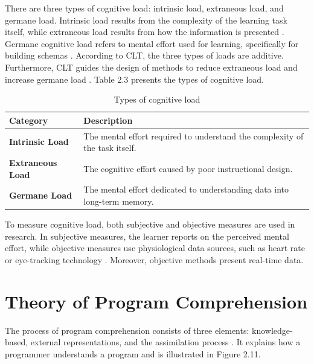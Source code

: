 There are three types of cognitive load: intrinsic load, extraneous load, and germane load. Intrinsic load results from the complexity of the learning task itself, while extraneous load results from how the information is presented \cite{schnotz2007reconsideration}. Germane cognitive load refers to mental effort used for learning, specifically for building schemas \cite{chen2009cognitive}. According to CLT, the three types of loads are additive. Furthermore, CLT guides the design of methods to reduce extraneous load and increase germane load  \cite{chen2009cognitive}. Table 2.3 presents the types of cognitive load.



\begin{table}[ht]
\centering
\small 
\caption{Types of cognitive load}
\begin{tabular}{p{} | p{}}
\hline
\rule{0pt}{1.2em}\textbf{Category} & \textbf{Description} \\[0.5em]
\hline
\rule{0pt}{1.2em}\textbf{Intrinsic Load} & The mental effort required to understand the complexity of the task itself. \\[0.5em]
\hline
\rule{0pt}{1.2em}\textbf{Extraneous Load} & The cognitive effort caused by poor instructional design. \\[0.5em]
\hline
\rule{0pt}{1.2em}\textbf{Germane Load} & The mental effort dedicated to understanding data into long-term memory. \\[0.5em]
\hline
\end{tabular}
\label{tab:cognitive_load}
\end{table}



To measure cognitive load, both subjective and objective measures are used in research.
In subjective measures, the  learner reports on the perceived mental effort, while objective measures use physiological data sources, such as heart rate or eye-tracking technology \cite{duran2022cognitive}. Moreover, objective methods present real-time data.


\section{Theory of Program Comprehension}

The process of program comprehension consists of three elements: knowledge-based, external representations, and the assimilation process \cite{kadar2021program}. It explains how a programmer understands a program and is illustrated in Figure 2.11.


